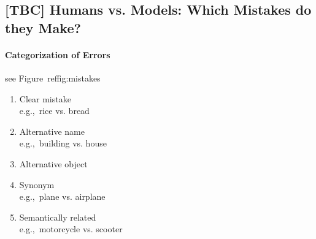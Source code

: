 \subsection{[TBC] Humans vs. Models: Which Mistakes do they Make?}
\label{sect:exp_analysis}

\paragraph{Categorization of Errors}
see Figure\ ref{fig:mistakes}
\begin{enumerate}
	\item Clear mistake \\
	e.g.,\ rice vs. bread
	\item Alternative name\\
	e.g.,\ building vs. house
	\item Alternative object 
	\item Synonym\\
	e.g.,\ plane vs. airplane
	\item Semantically related\\
	e.g.,\  motorcycle vs. scooter
\end{enumerate}

